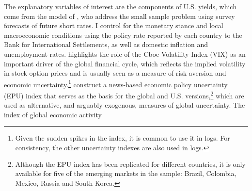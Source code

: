 {%
The explanatory variables of interest are the components of U.S. yields, which come from %
the model of \cite{KimWright:2005}, who %
address the small sample problem using survey forecasts of future short rates.
I control for the monetary stance and local macroeconomic conditions using the policy rate reported by each country to the Bank for International Settlements, as well as domestic inflation and unemployment rates. %
\cite{Rey:2013} highlights the role of the Cboe Volatility Index (VIX) as an important driver of the global financial cycle,
which reflects the implied volatility in stock option prices and is usually seen as a measure of risk aversion and economic uncertainty.\footnote{ Given the sudden spikes in the index, it is common to use it in logs. For consistency, the other uncertainty indexes are also used in logs.}
\cite{BakerBloomDavis:2016} construct a news-based economic policy uncertainty (EPU) index that serves as the basis for the global and U.S. versions,\footnote{ Although the EPU index has been replicated for different countries, it is only available for five of the emerging markets in the sample: Brazil, Colombia, Mexico, Russia and South Korea.} %
which are used as alternative, and arguably exogenous, measures of global uncertainty.
The index of global economic activity %
}
